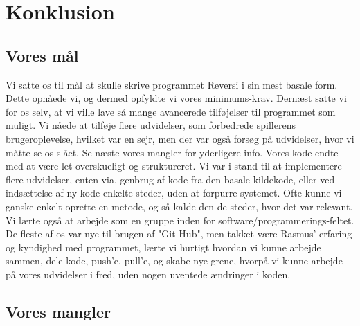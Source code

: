 \section{Konklusion}
\subsection{Vores mål}\label{VM}
Vi satte os til mål at skulle skrive programmet Reversi i sin mest basale form. Dette opnåede vi, og dermed opfyldte vi vores minimums-krav. Dernæst satte vi for os selv, at vi ville lave så mange avancerede tilføjelser til programmet som muligt. Vi nåede at tilføje flere udvidelser, som forbedrede spillerens brugeroplevelse, hvilket var en sejr, men der var også forsøg på udvidelser, hvor vi måtte se os slået. Se næste {vores mangler} for yderligere info.
Vores kode endte med at være let overskueligt og struktureret. Vi var i stand til at implementere flere udvidelser, enten via. genbrug af kode fra den basale kildekode, eller ved indsættelse af ny kode enkelte steder, uden at forpurre systemet. Ofte kunne vi ganske enkelt oprette en metode, og så kalde den de steder, hvor det var relevant. 
Vi lærte også at arbejde som en gruppe inden for software/programmerings-feltet. De fleste af os var nye til brugen af "Git-Hub", men takket være Rasmus' erfaring og kyndighed med programmet, lærte vi hurtigt hvordan vi kunne arbejde sammen, dele kode, push'e, pull'e, og skabe nye grene, hvorpå vi kunne arbejde på vores udvidelser i fred, uden nogen uventede ændringer i koden.
\subsection{Vores mangler}
